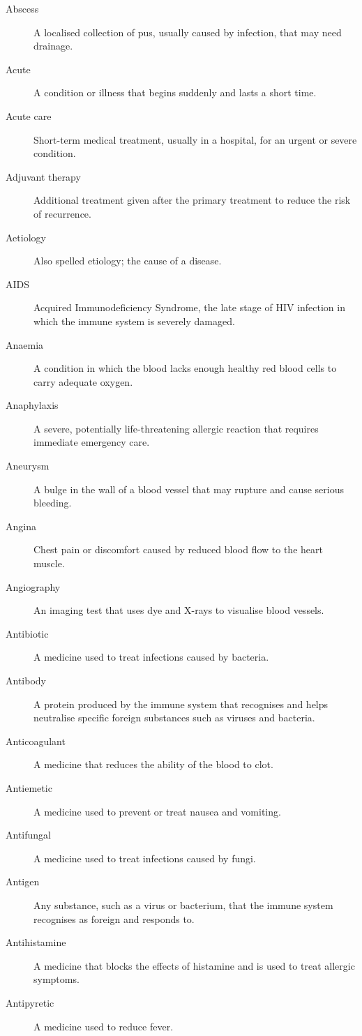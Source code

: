 \documentclass[12pt,oneside]{book}
\begin{document}
\begin{description}
  \item[Abscess] A localised collection of pus, usually caused by infection, that may need drainage.
  \item[Acute] A condition or illness that begins suddenly and lasts a short time.
  \item[Acute care] Short-term medical treatment, usually in a hospital, for an urgent or severe condition.
  \item[Adjuvant therapy] Additional treatment given after the primary treatment to reduce the risk of recurrence.
  \item[Aetiology] Also spelled etiology; the cause of a disease.
  \item[AIDS] Acquired Immunodeficiency Syndrome, the late stage of HIV infection in which the immune system is severely damaged.
  \item[Anaemia] A condition in which the blood lacks enough healthy red blood cells to carry adequate oxygen.
  \item[Anaphylaxis] A severe, potentially life-threatening allergic reaction that requires immediate emergency care.
  \item[Aneurysm] A bulge in the wall of a blood vessel that may rupture and cause serious bleeding.
  \item[Angina] Chest pain or discomfort caused by reduced blood flow to the heart muscle.
  \item[Angiography] An imaging test that uses dye and X-rays to visualise blood vessels.
  \item[Antibiotic] A medicine used to treat infections caused by bacteria.
  \item[Antibody] A protein produced by the immune system that recognises and helps neutralise specific foreign substances such as viruses and bacteria.
  \item[Anticoagulant] A medicine that reduces the ability of the blood to clot.
  \item[Antiemetic] A medicine used to prevent or treat nausea and vomiting.
  \item[Antifungal] A medicine used to treat infections caused by fungi.
  \item[Antigen] Any substance, such as a virus or bacterium, that the immune system recognises as foreign and responds to.
  \item[Antihistamine] A medicine that blocks the effects of histamine and is used to treat allergic symptoms.
  \item[Antipyretic] A medicine used to reduce fever.

\end{description}
\end{document}
